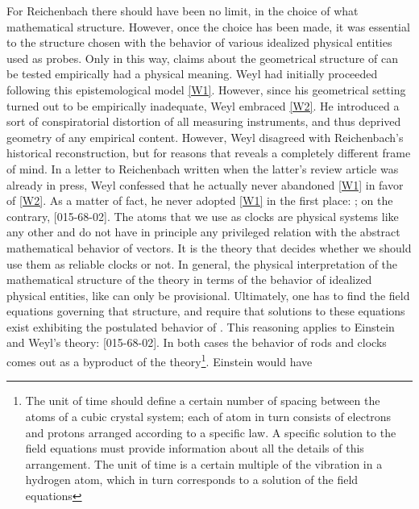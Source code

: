\documentclass[draft]{article}
\newcommand{\WT}{Weyl's theory\xspace}
\begin{document}
For Reichenbach there should have been no limit, in the choice of what mathematical structure. However, once the choice has been made, it was essential to  the structure chosen with the behavior of various idealized physical entities used as probes. Only in this way, claims about the geometrical structure of \spti can be tested empirically had a physical meaning. Weyl had initially proceeded following this epistemological model \ref{W1}. However, since his geometrical setting turned out to be empirically inadequate, Weyl embraced \ref{W2}. He introduced a sort of conspiratorial distortion of all measuring instruments, and thus deprived geometry of any empirical content. However, Weyl disagreed with Reichenbach's historical reconstruction, but for reasons that reveals a completely different frame of mind. In a letter to Reichenbach written when the latter's review article was already in press, Weyl confessed that he actually never abandoned \ref{W1} in favor of \ref{W2}. As a matter of fact, he never adopted \ref{W1} in the first place: ; on the contrary,  [015-68-02]. The atoms that we use as clocks are physical systems like any other and do not have in principle any privileged relation with the abstract mathematical behavior of vectors. It is the theory that decides whether we should use them as reliable clocks or not. In general, the physical interpretation of the mathematical structure of the theory in terms of the behavior of idealized physical entities, like \rac can only be provisional. Ultimately, one has to find the field equations governing that structure, and require that solutions to these equations exist exhibiting the postulated behavior of \rac. This reasoning applies to Einstein and \WT:  [015-68-02]. In both cases the behavior of rods and clocks comes out as a byproduct of the theory\footnote{The unit of time should define a certain number of spacing between the atoms of a cubic crystal system; each of atom in turn consists of electrons and protons arranged according to a specific law. A specific solution to the field equations must provide information about all the details of this arrangement.  The unit of time is a certain multiple of the vibration in a hydrogen atom, which in turn corresponds to a solution of the field equations}. Einstein would have 
\end{document}
